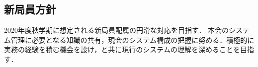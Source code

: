 \subsection*{新局員方針}


2020年度秋学期に想定される新局員配属の円滑な対応を目指す．
本会のシステム管理に必要となる知識の共有，現会のシステム構成の把握に努める．積極的に実務の経験を積む機会を設け，\secondGrade{}と共に現行のシステムの理解を深めることを目指す．
